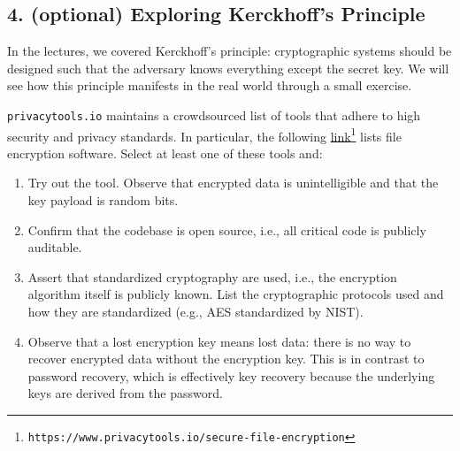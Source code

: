 \documentclass[11pt]{article}
\begin{document}
\subsection*{4. (optional) Exploring Kerckhoff's Principle}

In the lectures, we covered Kerckhoff's principle: cryptographic systems should be designed such that the adversary knows everything except the secret key. We will see how this principle manifests in the real world through a small exercise.
\medskip

\noindent \texttt{privacytools.io} maintains a crowdsourced list of tools that adhere to high security and privacy standards. In particular, the following \href{https://www.privacytools.io/secure-file-encryption}{link}\footnote{\texttt{https://www.privacytools.io/secure-file-encryption}} lists file encryption software. Select at least one of these tools and:

\begin{enumerate}[label=(\alph*)]
    \item Try out the tool. Observe that encrypted data is unintelligible and that the key payload is random bits.
    \item Confirm that the codebase is open source, i.e., all critical code is publicly auditable.
    \item Assert that standardized cryptography are used, i.e., the encryption algorithm itself is publicly known. List the cryptographic protocols used and how they are standardized (e.g., AES standardized by NIST).
    \item Observe that a lost encryption key means lost data: there is no way to recover encrypted data without the encryption key. This is in contrast to password recovery, which is effectively key recovery because the underlying keys are derived from the password.
    
\end{enumerate}
\end{document}
